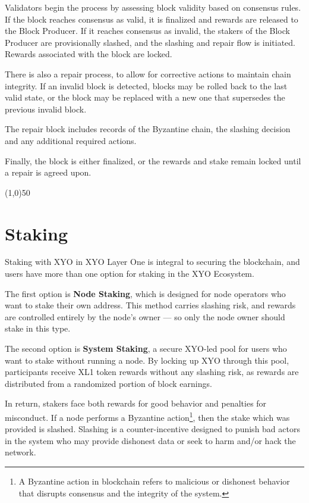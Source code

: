\documentclass{article}
\begin{document}
Validators begin the process by assessing block validity based on consensus rules. If the block reaches consensus as valid, it is finalized and rewards are released to the Block Producer. If it reaches consensus as invalid, the stakers of the Block Producer are provisionally slashed, and the slashing and repair flow is initiated. Rewards associated with the block are locked.

There is also a repair process, to allow for corrective actions to maintain chain integrity. If an invalid block is detected, blocks may be rolled back to the last valid state, or the block may be replaced with a new one that supersedes the previous invalid block.

The repair block includes records of the Byzantine chain, the slashing decision and any additional required actions.

Finally, the block is either finalized, or the rewards and stake remain locked until a repair is agreed upon.

\begin{center}
\line(1,0){50}
\end{center}


\section{Staking}
Staking with XYO in XYO Layer One is integral to securing the blockchain, and users have more than one option for staking in the XYO Ecosystem. 

The first option is \textbf{Node Staking}, which is designed for node operators who want to stake their own address. This method carries slashing risk, and rewards are controlled entirely by the node's owner — so only the node owner should stake in this type. 

The second option is \textbf{System Staking}, a secure XYO-led pool for users who want to stake without running a node. By locking up XYO through this pool, participants receive XL1 token rewards without any slashing risk, as rewards are distributed from a randomized portion of block earnings.

In return, stakers face both rewards for good behavior and penalties for misconduct. If a node performs a Byzantine action\footnote{A Byzantine action in blockchain refers to malicious or dishonest behavior that disrupts consensus and the integrity of the system.}, then the stake which was provided is slashed. Slashing is a counter-incentive designed to punish bad actors in the system who may provide dishonest data or seek to harm and/or hack the network.
\end{document}
